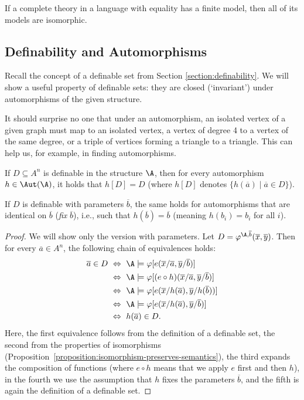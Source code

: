 \begin{corollary}
    If a complete theory in a language with equality has a finite model, then all of its models are isomorphic.
\end{corollary}

\subsection{Definability and Automorphisms}

Recall the concept of a definable set from Section \ref{section:definability}. We will show a useful property of definable sets: they are closed (`invariant') under automorphisms of the given structure.

It should surprise no one that under an automorphism, an isolated vertex of a given graph must map to an isolated vertex, a vertex of degree 4 to a vertex of the same degree, or a triple of vertices forming a triangle to a triangle. This can help us, for example, in finding automorphisms.

\begin{proposition}
    If $D \subseteq A^n$ is definable in the structure $\A$, then for every automorphism $h \in \Aut(\A)$, it holds that $h[D] = D$ (where $h[D]$ denotes $\{h(\overline{a}) \mid \overline{a} \in D\}$).

    If $D$ is definable with parameters $\overline{b}$, the same holds for automorphisms that are identical on $\overline{b}$ (\emph{fix} $\overline{b}$), i.e., such that $h(\overline{b}) = \overline{b}$ (meaning $h(b_i) = b_i$ for all $i$).
\end{proposition}
\begin{proof}
    We will show only the version with parameters. Let $D = \varphi^{\A, \overline{b}}(\overline{x}, \overline{y})$. Then for every $\overline{a} \in A^n$, the following chain of equivalences holds:
\begin{align*}
\overline{a} \in D\ 
&\Leftrightarrow\ \A \models \varphi[e(\overline{x}/\overline{a}, \overline{y}/\overline{b})] \\
&\Leftrightarrow\ \A \models \varphi[(e \circ h)(\overline{x}/\overline{a}, \overline{y}/\overline{b})] \\
&\Leftrightarrow\ \A \models \varphi[e(\overline{x}/h(\overline{a}), \overline{y}/h(\overline{b}))] \\
&\Leftrightarrow\ \A \models \varphi[e(\overline{x}/h(\overline{a}), \overline{y}/\overline{b})] \\
&\Leftrightarrow\ h(\overline{a}) \in D.
\end{align*}
Here, the first equivalence follows from the definition of a definable set, the second from the properties of isomorphisms (Proposition~\ref{proposition:isomorphism-preserves-semantics}), the third expands the composition of functions (where $e \circ h$ means that we apply $e$ first and then $h$), in the fourth we use the assumption that $h$ fixes the parameters $\overline{b}$, and the fifth is again the definition of a definable set.
\end{proof}

